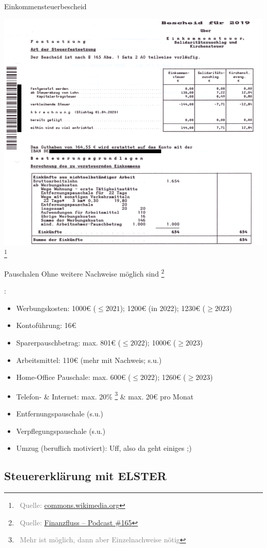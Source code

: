 \documentclass{beamer}
\let\oldfootnote\footnote
\renewcommand{\footnote}[1]
{%
	\oldfootnote
	{
		\tiny
		\textcolor{gray}{\ #1}
	}%
}
\newcommand{\citeurl}[2]
{%
	\footnote{Quelle: \href{#1}{#2}}
}
\begin{document}
			\begin{frame}{Einkommensteuerbescheid}
				\begin{center}
					\includegraphics[width=0.55\linewidth]{images/einkommensteuerbescheid_2019}
					\citeurl{https://de.wikipedia.org/wiki/Datei:Einkommensteuerbescheid_2019.pdf}{commons.wikimedia.org}
				\end{center}
			\end{frame}
		
			\begin{frame}{Pauschalen}
				Ohne weitere Nachweise möglich sind\citeurl{https://www.finanzfluss.de/podcast/folge-165/}{Finanzfluss -- Podcast \#165}:
				\begin{itemize}
					\item Werbungskosten: 1000€ ($\leq2021$); 1200€ (in 2022); 1230€ ($\geq2023$)
					\item Kontoführung: 16€
					\item Sparerpauschbetrag: max. 801€ ($\leq2022$); 1000€ ($\geq2023$)
					\pause
					\item Arbeitsmittel: 110€ (mehr mit Nachweis; s.u.)
					\item Home-Office Pauschale: max. 600€ ($\leq2022$); 1260€ ($\geq2023$)
					\item Telefon- \& Internet: max. 20\%\footnote{\label{mehr-moeglich}Mehr ist möglich, dann aber Einzelnachweise nötig} \& max. 20€ pro Monat
					\pause
					\item Entfernungspauschale (s.u.)
					\item Verpflegungspauschale (s.u.)
					\pause
					\item Umzug (beruflich motiviert): Uff, also da geht einiges ;)
				\end{itemize}
			\end{frame}
		
		\subsection{Steuererklärung mit ELSTER}
		
\end{document}
